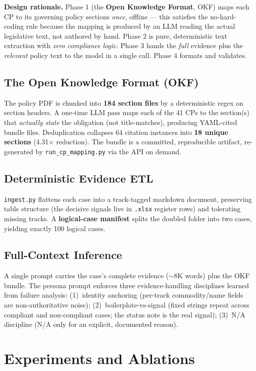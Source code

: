 \documentclass[11pt,a4paper]{article}
\begin{document}
\textbf{Design rationale.} Phase 1 (the \textbf{Open Knowledge Format}, OKF) maps each CP to its governing policy sections \emph{once}, offline --- this satisfies the no-hard-coding rule because the mapping is produced by an LLM reading the actual legislative text, not authored by hand. Phase 2 is pure, deterministic text extraction with \emph{zero compliance logic}. Phase 3 hands the \emph{full} evidence plus the \emph{relevant} policy text to the model in a single call. Phase 4 formats and validates.

\subsection{The Open Knowledge Format (OKF)}
The policy PDF is chunked into \textbf{184 section files} by a deterministic regex on section headers. A one-time LLM pass maps each of the 41 CPs to the section(s) that \emph{actually state} the obligation (not title-matches), producing YAML-cited bundle files. Deduplication collapses 64 citation instances into \textbf{18 unique sections} (4.31$\times$ reduction). The bundle is a committed, reproducible artifact, re-generated by \texttt{run\_cp\_mapping.py} via the API on demand.

\subsection{Deterministic Evidence ETL}
\texttt{ingest.py} flattens each case into a track-tagged markdown document, preserving table structure (the decisive signals live in \texttt{.xlsx} register rows) and tolerating missing tracks. A \textbf{logical-case manifest} splits the doubled folder into two cases, yielding exactly 100 logical cases.

\subsection{Full-Context Inference}
A single prompt carries the case's complete evidence ($\sim$8K words) plus the OKF bundle. The persona prompt enforces three evidence-handling disciplines learned from failure analysis: (1)~identity anchoring (per-track commodity/name fields are non-authoritative noise); (2)~boilerplate-vs-signal (fixed strings repeat across compliant and non-compliant cases; the status note is the real signal); (3)~N/A discipline (N/A only for an explicit, documented reason).

\section{Experiments and Ablations}
\end{document}
